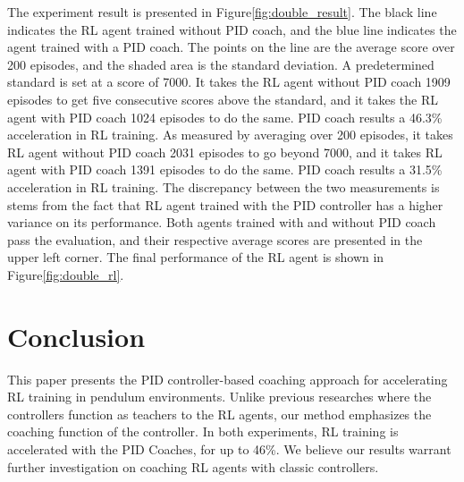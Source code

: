 \documentclass{IJCAS}
\begin{document}
The experiment result is presented in Figure\ref{fig:double_result}. The black line indicates the RL agent trained without PID coach, and the blue line indicates the agent trained with a PID coach. The points on the line are the average score over 200 episodes, and the shaded area is the standard deviation. A predetermined standard is set at a score of 7000. It takes the RL agent without PID coach 1909 episodes to get five consecutive scores above the standard, and it takes the RL agent with PID coach 1024 episodes to do the same. PID coach results a 46.3\% acceleration in RL training. As measured by averaging over 200 episodes, it takes RL agent without PID coach 2031 episodes to go beyond 7000, and it takes RL agent with PID coach 1391 episodes to do the same. PID coach results a 31.5\% acceleration in RL training. The discrepancy between the two measurements is stems from the fact that RL agent trained with the PID controller has a higher variance on its performance. Both agents trained with and without PID coach pass the evaluation, and their respective average scores are presented in the upper left corner. The final performance of the RL agent is shown in Figure\ref{fig:double_rl}.

\section{Conclusion}

This paper presents the PID controller-based coaching approach for accelerating RL training in pendulum environments. Unlike previous researches where the controllers function as teachers to the RL agents, our method emphasizes the coaching function of the controller. In both experiments, RL training is accelerated with the PID Coaches, for up to 46\%. We believe our results warrant further investigation on coaching RL agents with classic controllers. 




 

\clearafterbiography\relax
\end{document}

